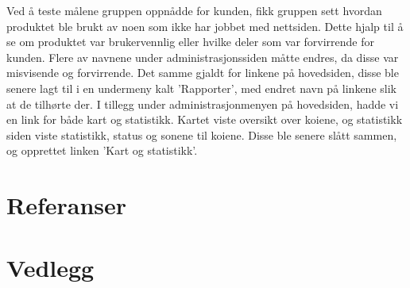 \documentclass[12pt,a4paper,norsk]{article}
\begin{document}
Ved å teste målene gruppen oppnådde for kunden, fikk gruppen sett hvordan produktet ble brukt av noen som ikke har jobbet med nettsiden. Dette hjalp til å se om produktet var brukervennlig eller hvilke deler som var forvirrende for kunden. Flere av navnene under administrasjonssiden måtte endres, da disse var misvisende og forvirrende. Det samme gjaldt for linkene på hovedsiden, disse ble senere lagt til i en undermeny kalt 'Rapporter', med endret navn på linkene slik at de tilhørte der. I tillegg under administrasjonmenyen på hovedsiden, hadde vi en link for både kart og statistikk. Kartet viste oversikt over koiene, og statistikk siden viste statistikk, status og sonene til koiene. Disse ble senere slått sammen, og opprettet linken 'Kart og statistikk'.

\newpage
{}
\section{Referanser}


\section{Vedlegg}










%



\end{document}

